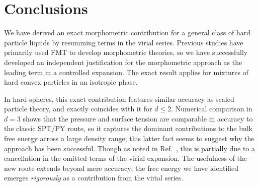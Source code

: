 \documentclass[11pt,twoside]{report}
\begin{document}
\section{Conclusions}

We have derived an exact morphometric contribution for a general class of hard particle liquids by resumming terms in the virial series.
Previous studies have primarily used FMT to develop morphometric theories, so we have successfully developed an independent justification for the morphometric approach as the leading term in a controlled expansion.
The exact result applies for mixtures of hard convex particles in an isotropic phase.


In hard spheres, this exact contribution features similar accuracy as scaled particle theory, and exactly coincides with it for $d \le 2$.
Numerical comparison in $d=3$ shows that the pressure and surface tension are comparable in accuracy to the classic SPT/PY route, so it captures the dominant contributions to the bulk free energy across a large density range; this latter fact seems to suggest why the approach has been successful.
Though as noted in Ref.\ \cite{MarechalPRE2014}, this is partially due to a cancellation in the omitted terms of the virial expansion.%
The usefulness of the new route extends beyond mere accuracy; the free energy we have identified emerges \emph{rigorously} as a contribution from the virial series.
\end{document}
